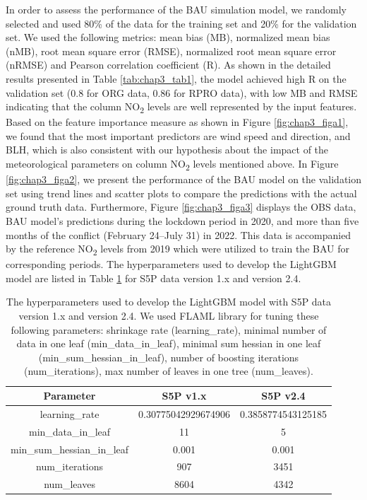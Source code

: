 In order to assess the performance of the BAU simulation model, we randomly selected and used 80\% of the data for the training set and 20\% for the validation set. We used the following metrics: mean bias (MB), normalized mean bias (nMB), root mean square error (RMSE), normalized root mean square error (nRMSE) and Pearson correlation coefficient (R). As shown in the detailed results presented in Table \ref{tab:chap3_tab1}, the model achieved high R on the validation set (0.8 for ORG data, 0.86 for RPRO data), with low MB and RMSE indicating that the column NO\textsubscript{2} levels are well represented by the input features. Based on the feature importance measure as shown in Figure \ref{fig:chap3_figa1}, we found that the most important predictors are wind speed and direction, and BLH, which is also consistent with our hypothesis about the impact of the meteorological parameters on column NO\textsubscript{2} levels mentioned above. In Figure \ref{fig:chap3_figa2}, we present the performance of the BAU model on the validation set using trend lines and scatter plots to compare the predictions with the actual ground truth data. Furthermore, Figure \ref{fig:chap3_figa3} displays the OBS data, BAU model’s predictions during the lockdown period in 2020, and more than five months of the conflict (February 24–July 31) in 2022. This data is accompanied by the reference NO\textsubscript{2} levels from 2019 which were utilized to train the BAU for corresponding periods. The hyperparameters used to develop the LightGBM model are listed in Table \ref{tab:chap3_taba1} for S5P data version 1.x and version 2.4. \par

\begin{table}[tbh!]
    \centering
    \caption[The hyperparameters used to develop the LightGBM model]{The hyperparameters used to develop the LightGBM model with S5P data version 1.x and version 2.4. We used FLAML library \citep{wang2021flaml} for tuning these following parameters: shrinkage rate (learning\_rate), minimal number of data in one leaf (min\_data\_in\_leaf), minimal sum hessian in one leaf (min\_sum\_hessian\_in\_leaf), number of boosting iterations (num\_iterations), max number of leaves in one tree (num\_leaves).}
    \begin{tabular}{c c c}
        \hline
            Parameter & S5P v1.x & S5P v2.4  \\ \hline
            learning\_rate & 0.30775042929674906 & 0.3858774543125185  \\
            min\_data\_in\_leaf & 11 & 5  \\
            min\_sum\_hessian\_in\_leaf & 0.001 & 0.001  \\
            num\_iterations & 907 & 3451  \\
            num\_leaves & 8604 & 4342  \\ \hline
    \end{tabular}
    \label{tab:chap3_taba1}

\end{table}

